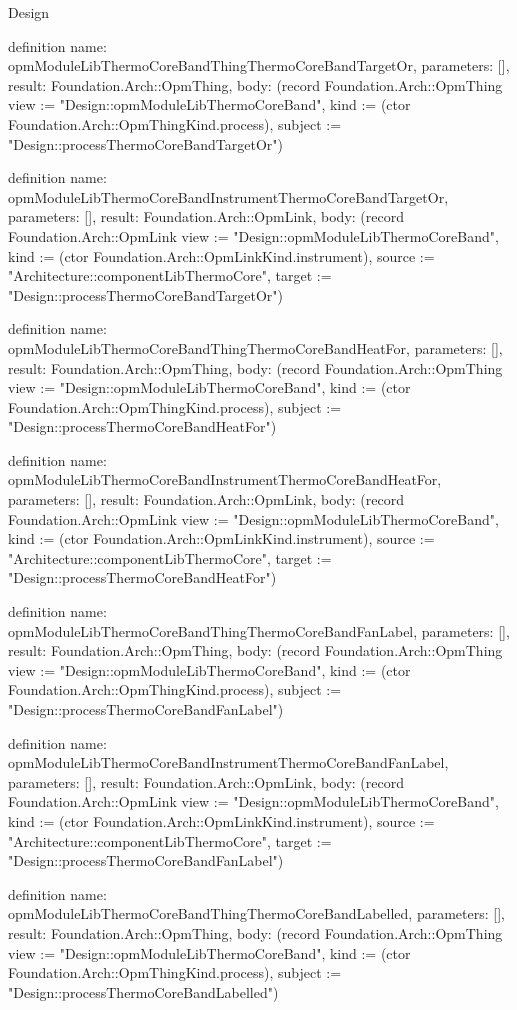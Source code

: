 \begin{lexlean}{Design}
\begin{semanticmodule}
definition{
  name: opmModuleLibThermoCoreBandThingThermoCoreBandTargetOr,
  parameters: [],
  result: Foundation.Arch::OpmThing,
  body: (record Foundation.Arch::OpmThing {view := "Design::opmModuleLibThermoCoreBand", kind := (ctor Foundation.Arch::OpmThingKind.process), subject := "Design::processThermoCoreBandTargetOr"})
}

definition{
  name: opmModuleLibThermoCoreBandInstrumentThermoCoreBandTargetOr,
  parameters: [],
  result: Foundation.Arch::OpmLink,
  body: (record Foundation.Arch::OpmLink {view := "Design::opmModuleLibThermoCoreBand", kind := (ctor Foundation.Arch::OpmLinkKind.instrument), source := "Architecture::componentLibThermoCore", target := "Design::processThermoCoreBandTargetOr"})
}

definition{
  name: opmModuleLibThermoCoreBandThingThermoCoreBandHeatFor,
  parameters: [],
  result: Foundation.Arch::OpmThing,
  body: (record Foundation.Arch::OpmThing {view := "Design::opmModuleLibThermoCoreBand", kind := (ctor Foundation.Arch::OpmThingKind.process), subject := "Design::processThermoCoreBandHeatFor"})
}

definition{
  name: opmModuleLibThermoCoreBandInstrumentThermoCoreBandHeatFor,
  parameters: [],
  result: Foundation.Arch::OpmLink,
  body: (record Foundation.Arch::OpmLink {view := "Design::opmModuleLibThermoCoreBand", kind := (ctor Foundation.Arch::OpmLinkKind.instrument), source := "Architecture::componentLibThermoCore", target := "Design::processThermoCoreBandHeatFor"})
}

definition{
  name: opmModuleLibThermoCoreBandThingThermoCoreBandFanLabel,
  parameters: [],
  result: Foundation.Arch::OpmThing,
  body: (record Foundation.Arch::OpmThing {view := "Design::opmModuleLibThermoCoreBand", kind := (ctor Foundation.Arch::OpmThingKind.process), subject := "Design::processThermoCoreBandFanLabel"})
}

definition{
  name: opmModuleLibThermoCoreBandInstrumentThermoCoreBandFanLabel,
  parameters: [],
  result: Foundation.Arch::OpmLink,
  body: (record Foundation.Arch::OpmLink {view := "Design::opmModuleLibThermoCoreBand", kind := (ctor Foundation.Arch::OpmLinkKind.instrument), source := "Architecture::componentLibThermoCore", target := "Design::processThermoCoreBandFanLabel"})
}

definition{
  name: opmModuleLibThermoCoreBandThingThermoCoreBandLabelled,
  parameters: [],
  result: Foundation.Arch::OpmThing,
  body: (record Foundation.Arch::OpmThing {view := "Design::opmModuleLibThermoCoreBand", kind := (ctor Foundation.Arch::OpmThingKind.process), subject := "Design::processThermoCoreBandLabelled"})
}


\end{semanticmodule}
\end{lexlean}

